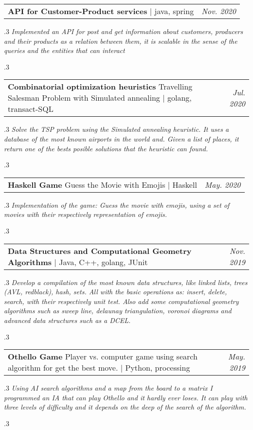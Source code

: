 \documentclass[letterpaper,
  10pt]{article}
\makeatletter
\let\oldhref\href
\renewcommand{\href}[3][blue]{\oldhref{#2}{\color{#1}{#3}}}
\newcommand{\personalProject}[6]{
\vspace{-2pt}\item
    \begin{tabular*}{1\textwidth}[t]{l@{\extracolsep{\fill}}r}
        \textbf{#1} #2 | #5 & \textit{\footnotesize{#3}}\\
    \end{tabular*}\vspace{-3pt}
    \begin{minipage}[t]{.7\textwidth}
      \begin{spacing}{.3}
        \textit{\small#6}
      \end{spacing}
    \end{minipage}
    \begin{minipage}[t]{.3\textwidth}
      \begin{spacing}{.3}
        \hspace*{1.8in} \footnotesize{#4}
      \end{spacing}
    \end{minipage}
}
\makeatother
\begin{document}
\personalProject {API for Customer-Product services} %
                 {} %
                 {Nov. 2020} %
                 {} %
                 {java, spring}
                 {Implemented an API for post and get information about customers, producers and their products as a relation between them, it is scalable in the sense of the queries and the entities that can interact}

\personalProject {Combinatorial optimization heuristics} %
                 {Travelling Salesman Problem with Simulated annealing} %
                 {Jul. 2020} %
                 {\href{https://github.com/mildewyPrawn/Heuristicas/tree/master/TSP}{gitHub}} %
                 {golang, transact-SQL}
                 {Solve the TSP problem using the Simulated annealing heuristic. It uses a database of the most known airports in the world and. Given a list of places, it return one of the bests posible solutions that the heuristic can found.}

\personalProject {Haskell Game} %
                 {Guess the Movie with Emojis} %
                 {May. 2020} %
                 {\href{}{gitLab}} %
                 {Haskell}
                 {Implementation of the game: Guess the movie with emojis, using a set of movies with their respectively representation of emojis.}

\personalProject {Data Structures and Computational Geometry Algorithms} %
                 {} %
                 {Nov. 2019} %
                 {\href{https://github.com/mildewyPrawn/EDD}{gitHub}} %
                 {Java, C++, golang, JUnit}
                 {Develop a compilation of the most known data structures, like linked lists, trees (AVL, redblack), hash, sets. All with the basic operations as: insert, delete, search, with their respectively unit test. Also add some computational geometry algorithms such as sweep line, delaunay triangulation, voronoi diagrams and advanced data structures such as a DCEL.}

\personalProject {Othello Game} %
                 {Player vs. computer game using search algorithm for get the best move.} %
                 {May. 2019} %
                 {\href{https://github.com/mildewyPrawn/IA/tree/master/Gustavo/Proyecto2/ProyectoOthelloPy}{gitHub}}
                 {Python, processing}
                 {Using AI search algorithms and a map from the board to a matrix I programmed an IA that can play Othello and it hardly ever loses. It can play with three levels of difficulty and it depends on the deep of the search of the algorithm.}
\end{document}
